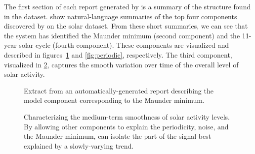 The first section of each report generated by \procedurename is a summary of the structure found in the dataset.
 show natural-language summaries of the top four components discovered by \procedurename{} on the solar dataset.
From these short summaries, we can see that the system has identified the Maunder minimum (second component) and the 11-year solar cycle (fourth component).
These components are visualized and described in figures~\ref{fig:maunder} and \ref{fig:periodic}, respectively. 
The third component, visualized in \cref{fig:smooth}, captures the smooth variation over time of the overall level of solar activity.
%
\begin{figure}[ht!]%
\centering
{}
\caption[A component corresponding to the Maunder minimum]
{Extract from an automatically-generated report describing the model component corresponding to the Maunder minimum.}
\label{fig:maunder}
\end{figure}

\begin{figure}[ht!]
\centering
{}
\caption[\procedurename{} isolating part of the signal explained by a slowly-varying trend]
{Characterizing the medium-term smoothness of solar activity levels.
By allowing other components to explain the periodicity, noise, and the Maunder minimum, \procedurename{} can isolate the part of the signal best explained by a slowly-varying trend.}
\label{fig:smooth}
\end{figure}


